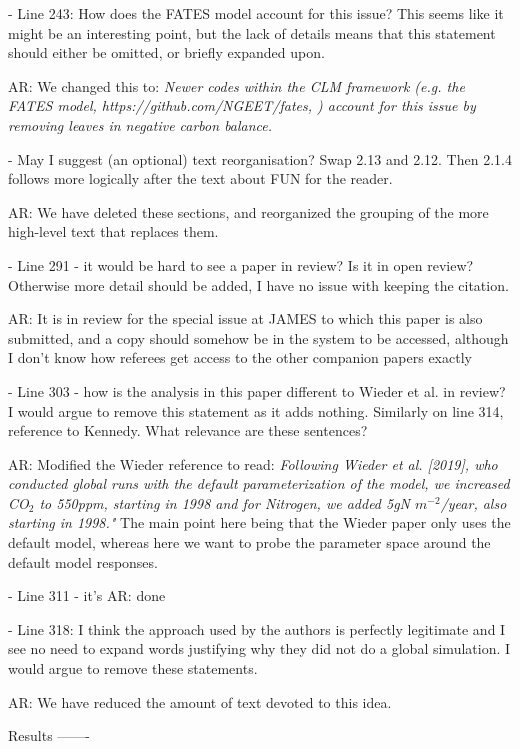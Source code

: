 \documentclass{article}
\begin{document}
- Line 243: How does the FATES model account for this issue? This seems like it might be an interesting point, but the lack of details means that this statement should either be omitted, or briefly expanded upon.

\textsf{AR: We changed this to: \emph{Newer codes within the CLM framework (e.g. the FATES model, https://github.com/NGEET/fates, \cite{fisher2015}) account for this issue by removing leaves in negative carbon balance.}}

- May I suggest (an optional) text reorganisation? Swap 2.13 and 2.12. Then 2.1.4 follows more logically after the text about FUN for the reader. 

\textsf{AR: We have deleted these sections, and reorganized the grouping of the more high-level text that replaces them.}

- Line 291 - it would be hard to see a paper in review? Is it in open review? Otherwise more detail should be added, I have no issue with keeping the citation. 

\textsf{AR: It is in review for the special issue at JAMES to which this paper is also submitted, and a copy should somehow be in the system to be accessed, although I don't know how referees get access to the other companion papers exactly}

- Line 303 - how is the analysis in this paper different to Wieder et al. in review? I would argue to remove this statement as it adds nothing. Similarly on line 314, reference to Kennedy. What relevance are these sentences?

\textsf{AR: Modified the Wieder reference to read: \emph{Following Wieder et al. [2019], who conducted global runs with the default parameterization of the model, we increased CO$_{2}$ to 550ppm, starting in 1998 and for Nitrogen, we added 5gN $m^{-2}$/year, also starting in 1998."} The main point here being that the Wieder paper only uses the default model, whereas here we want to probe the parameter space around the default model responses. }

- Line 311 - it's 
\textsf{AR: done}

- Line 318: I think the approach used by the authors is perfectly legitimate and I see no need to expand words justifying why they did not do a global simulation. I would argue to remove these statements. 

AR: \textsf{We have reduced the amount of text devoted to this idea.}

Results 
------- 
\end{document}
